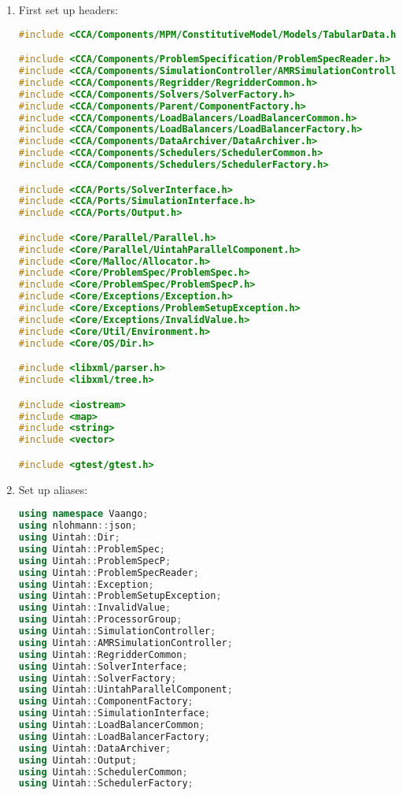 \begin{enumerate}
  \item First set up headers:
\begin{lstlisting}[language=Cpp]
#include <CCA/Components/MPM/ConstitutiveModel/Models/TabularData.h>

#include <CCA/Components/ProblemSpecification/ProblemSpecReader.h>
#include <CCA/Components/SimulationController/AMRSimulationController.h>
#include <CCA/Components/Regridder/RegridderCommon.h>
#include <CCA/Components/Solvers/SolverFactory.h>
#include <CCA/Components/Parent/ComponentFactory.h>
#include <CCA/Components/LoadBalancers/LoadBalancerCommon.h>
#include <CCA/Components/LoadBalancers/LoadBalancerFactory.h>
#include <CCA/Components/DataArchiver/DataArchiver.h>
#include <CCA/Components/Schedulers/SchedulerCommon.h>
#include <CCA/Components/Schedulers/SchedulerFactory.h>

#include <CCA/Ports/SolverInterface.h>
#include <CCA/Ports/SimulationInterface.h>
#include <CCA/Ports/Output.h>

#include <Core/Parallel/Parallel.h>
#include <Core/Parallel/UintahParallelComponent.h>
#include <Core/Malloc/Allocator.h>
#include <Core/ProblemSpec/ProblemSpec.h>
#include <Core/ProblemSpec/ProblemSpecP.h>
#include <Core/Exceptions/Exception.h>
#include <Core/Exceptions/ProblemSetupException.h>
#include <Core/Exceptions/InvalidValue.h>
#include <Core/Util/Environment.h>
#include <Core/OS/Dir.h>

#include <libxml/parser.h>
#include <libxml/tree.h>

#include <iostream>
#include <map>
#include <string>
#include <vector>

#include <gtest/gtest.h>
\end{lstlisting}

  \item Set up aliases:
\begin{lstlisting}[language=Cpp]
using namespace Vaango;
using nlohmann::json;
using Uintah::Dir;
using Uintah::ProblemSpec;
using Uintah::ProblemSpecP;
using Uintah::ProblemSpecReader;
using Uintah::Exception;
using Uintah::ProblemSetupException;
using Uintah::InvalidValue;
using Uintah::ProcessorGroup;
using Uintah::SimulationController;
using Uintah::AMRSimulationController;
using Uintah::RegridderCommon;
using Uintah::SolverInterface;
using Uintah::SolverFactory;
using Uintah::UintahParallelComponent;
using Uintah::ComponentFactory;
using Uintah::SimulationInterface;
using Uintah::LoadBalancerCommon;
using Uintah::LoadBalancerFactory;
using Uintah::DataArchiver;
using Uintah::Output;
using Uintah::SchedulerCommon;
using Uintah::SchedulerFactory;
\end{lstlisting}


\end{enumerate}
